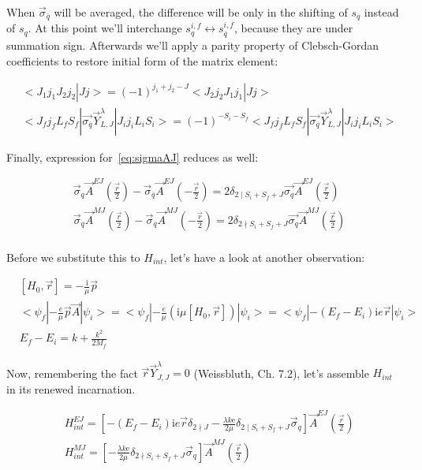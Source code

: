 When $\vec{\sigma}_{\overline{q}}$ will be averaged, the difference will be only in the shifting of $s_{\overline{q}}$ instead of $s_q$. At this point we'll interchange $s^{i,f}_{q} \leftrightarrow s^{i,f}_{\overline{q}}$, because they are under summation sign. Afterwards we'll apply a parity property of Clebsch-Gordan coefficients to restore initial form of the matrix element:

\begin{align}
    &<J_1 j_1 J_2 j_2 | J j> = (-1)^{j_1 + j_2 - J} <J_2 j_2 J_1 j_1 | J j> \\
    &<J_f j_f L_f S_f| \vec{\sigma_{\overline{q}}} \vec{Y}_{L, J}^\lambda |J_i j_i L_i S_i> = (-1)^{-S_i - S_f} <J_f j_f L_f S_f| \vec{\sigma_{q}} \vec{Y}_{L, J}^\lambda |J_i j_i L_i S_i>
\end{align}

Finally, expression for~\cref{eq:sigmaAJ} reduces as well:

\begin{align}
    &\vec{\sigma}_{q} \vec{A}^{EJ}(\frac{\vec{r}}{2}) - \vec{\sigma}_{\overline{q}} \vec{A}^{EJ}(-\frac{\vec{r}}{2}) = 2 \delta_{2 \mid S_i + S_f + J} \vec{\sigma_{q}} \vec{A}^{EJ}(\frac{\vec{r}}{2}) \\
    &\vec{\sigma}_{q} \vec{A}^{MJ}(\frac{\vec{r}}{2}) - \vec{\sigma}_{\overline{q}} \vec{A}^{MJ}(-\frac{\vec{r}}{2}) = 2 \delta_{2 \nmid S_i + S_f + J} \vec{\sigma_{q}} \vec{A}^{MJ}(\frac{\vec{r}}{2}) \\
\end{align}

Before we substitute this to $H_{int}$, let's have a look at another observation:

\begin{align}
    &[H_0, \vec{r}] = -\frac{\mathrm{i}}{\mu} \vec{p} \\
    &<\psi_f| -\frac{e}{\mu} \vec{p} \vec{A} |\psi_i> = <\psi_f| -\frac{e}{\mu} \left( \mathrm{i} \mu [H_0, \vec{r}]  \right) |\psi_i> = <\psi_f| -(E_f - E_i) \mathrm{i} e \vec{r} |\psi_i> \\
    &E_f - E_i = k + \frac{k^2}{2 M_f}
\end{align}

Now, remembering the fact $\vec{r} \vec{Y}^\lambda_{J, J} = 0$ (Weissbluth, Ch. 7.2)\cite{weissbluth}, let's assemble $H_{int}$ in its renewed incarnation.

\begin{align}
    &H_{int}^{EJ} = \left[-(E_f - E_i) \mathrm{i} e \vec{r} \delta_{2 \nmid J} - \frac{\lambda k \mathrm{e}}{2 \mu} \delta_{2 \mid S_i + S_f + J} \vec{\sigma}_{q} \right] \vec{A}^{EJ}(\frac{\vec{r}}{2}) \\
    &H_{int}^{MJ} = \left[ -\frac{\lambda k \mathrm{e}}{2 \mu} \delta_{2 \nmid S_i + S_f + J} \vec{\sigma}_{q} \right] \vec{A}^{MJ}(\frac{\vec{r}}{2})
\end{align}

